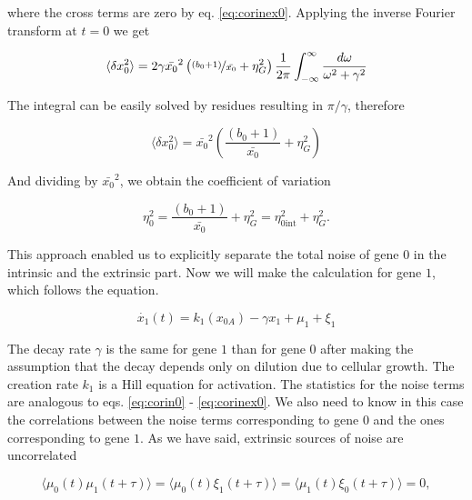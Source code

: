 where the cross terms are zero by eq. \eqref{eq:corinex0}. Applying the inverse Fourier transform at $t=0$ we get

\begin{equation*}
\langle \delta x_0^2 \rangle = 2\gamma\bar{x_0}^2\left(\nicefrac{(b_0+1)}{\bar{x_0}}+ \eta_G^2\right)\frac{1}{2\pi}\int_{-\infty}^{\infty}\frac{d\omega}{\omega^2+\gamma^2}
\end{equation*}

The integral can be easily solved by residues resulting in $\pi/\gamma$, therefore

\begin{equation*}
\langle \delta x_0^2 \rangle = \bar{x_0}^2\left(\frac{(b_0+1)}{\bar{x_0}}+ \eta_G^2\right)
\end{equation*}

And dividing by $\bar{x_0}^2$, we obtain the coefficient of variation

\begin{equation}
  \label{eq:etagene0}
  \boxed{\eta_0^2 = \frac{(b_0+1)}{\bar{x_0}}+ \eta_G^2 = \eta_{0\text{int}}^2+\eta_G^2}.
\end{equation}

This approach enabled us to explicitly separate the total noise of gene $0$ in the intrinsic and the extrinsic part. Now we will make the calculation for gene $1$, which follows the equation.

\begin{equation}
\label{eq:gene1}
\dot{x_1}(t) = k_1(x_{0A})-\gamma x_1+\mu_1+\xi_1
\end{equation}

The decay rate $\gamma$ is the same for gene $1$ than for gene $0$ after making the assumption that the decay depends only on dilution due to cellular growth. The creation rate $k_1$ is a Hill equation for activation. The statistics for the noise terms are analogous to eqs. \eqref{eq:corin0} - \eqref{eq:corinex0}. We also need to know in this case the correlations between the noise terms corresponding to gene $0$ and the ones corresponding to gene $1$. As we have said, extrinsic sources of noise are uncorrelated


\begin{equation}
\label{eq:corcross01}
\langle\mu_0(t)\mu_1(t+\tau)\rangle = \langle\mu_0(t)\xi_1(t+\tau)\rangle = \langle\mu_1(t)\xi_0(t+\tau)\rangle = 0,
\end{equation}

